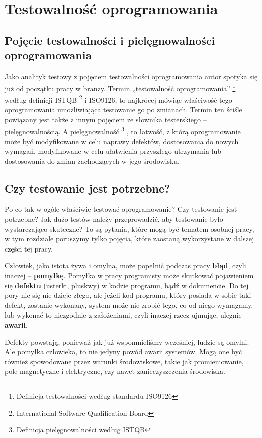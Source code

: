 \chapter{Testowalność oprogramowania}
\section{Pojęcie testowalności i pielęgnowalności oprogramowania}
Jako analityk testowy z pojęciem testowalności oprogramowania autor spotyka się już od początku pracy w branży. Termin „testowalność oprogramowania” \footnote{Definicja testowalności według standardu ISO9126}  według definicji ISTQB \footnote{International Software Qualification Board}  i ISO9126, to najkrócej mówiąc właściwość tego oprogramowania umożliwiająca testowanie go po zmianach. Termin ten ściśle powiązany jest także z innym pojęciem ze słownika testerskiego – pielęgnowalnością. A pielęgnowalność \footnote{Definicja pielęgnowalności według ISTQB} , to łatwość, z którą oprogramowanie może być modyfikowane w celu naprawy defektów, dostosowania do nowych wymagań, modyfikowane w celu ułatwienia przyszłego utrzymania lub dostosowania do zmian zachodzących w jego środowisku.

\section{Czy testowanie jest potrzebne?}
Po co tak w ogóle właściwie testować oprogramowanie? Czy testowanie jest potrzebne? Jak dużo testów należy przeprowadzić, aby testowanie było wystarczająco skuteczne? To są pytania, które mogą być tematem osobnej pracy, w tym rozdziale poruszymy tylko pojęcia, które zaostaną wykorzystane w dalszej części tej pracy.

Człowiek, jako istota żywa i omylna, może popełnić podczas pracy \textbf{błąd}, czyli inaczej – \textbf{pomyłkę}. Pomyłka w pracy programisty może skutkować pojawieniem się \textbf{defektu} (usterki, pluskwy) w kodzie programu, bądź w dokumencie. Do tej pory nic się nie dzieje złego, ale jeżeli kod programu, który posiada w sobie taki defekt, zostanie wykonany, system może nie zrobić tego, co od niego wymagamy, lub wykonać to niezgodnie z założeniami, czyli inaczej rzecz ujmując, ulegnie \textbf{awarii}. 

Defekty powstają, ponieważ jak już wspomnieliśmy wcześniej, ludzie są omylni. Ale pomyłka człowieka, to nie jedyny powód awarii systemów. Mogą one być również spowodowane przez warunki środowiskowe, takie jak promieniowanie, pole magnetyczne i elektryczne, czy nawet zanieczyszczenia środowiska.

